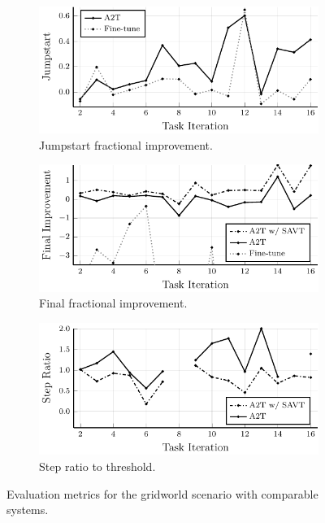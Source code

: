 \begin{figure}
    \centering
    \begin{subfigure}[b]{0.32\textwidth}
        \centering
        \includegraphics[width=\textwidth]{figures/iterative_validation/gridworld_comparison/jumpstart.pdf}
        \caption{Jumpstart fractional improvement.}
        \label{fig:gwc_jumpstart}
    \end{subfigure}
    \hfill
    \begin{subfigure}[b]{0.32\textwidth}
        \centering
        \includegraphics[width=\textwidth]{figures/iterative_validation/gridworld_comparison/peak_performance.pdf}
        \caption{Final fractional improvement.}
        \label{fig:gwc_final}
    \end{subfigure}
    \hfill
    \begin{subfigure}[b]{0.32\textwidth}
        \centering
        \includegraphics[width=\textwidth]{figures/iterative_validation/gridworld_comparison/steps_to_threshold.pdf}
        \caption{Step ratio to threshold.}
        \label{fig:gwc_step}
    \end{subfigure}
    \caption{Evaluation metrics for the gridworld scenario with comparable systems.}
    \label{fig:gwc}
\end{figure}




